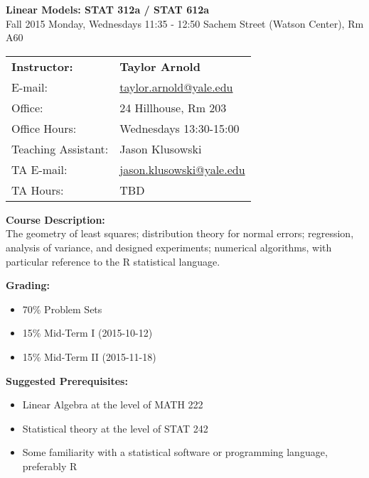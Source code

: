 \documentclass[12pt]{article}
\begin{document}
\begin{center}
{\bf Linear Models: STAT 312a / STAT 612a} \\
Fall 2015 \quad Monday, Wednesdays 11:35 - 12:50  Sachem Street (Watson Center), Rm A60
\end{center}

\bigskip

\noindent
\begin{tabular}{ l l }
{\bf Instructor:} &  {\bf Taylor Arnold} \\
E-mail: & \href{mailto:taylor.arnold@yale.edu}{taylor.arnold@yale.edu} \\
Office: & 24 Hillhouse, Rm 203 \\
Office Hours: & Wednesdays 13:30-15:00 \\
Teaching Assistant: & Jason Klusowski \\
TA E-mail: & \href{mailto:jason.klusowski@yale.edu}{jason.klusowski@yale.edu} \\
TA Hours: & TBD
\end{tabular}

\vspace{1cm}

{\bf Course Description:} \\
The geometry of least squares; distribution theory for normal errors; regression, analysis of variance, and designed experiments; numerical algorithms, with particular reference to the R statistical language.

\vspace{0.5cm}

{\bf Grading:}
\begin{itemize}\setlength\itemsep{0em}
\item 70\% Problem Sets
\item 15\% Mid-Term I (2015-10-12)
\item 15\% Mid-Term II (2015-11-18)
\end{itemize}

\vspace{0.5cm}

{\bf Suggested Prerequisites:}
\begin{itemize}\setlength\itemsep{0em}
\item Linear Algebra at the level of MATH 222
\item Statistical theory at the level of STAT 242
\item Some familiarity with a statistical software or programming language, preferably R
\end{itemize}
\end{document}
